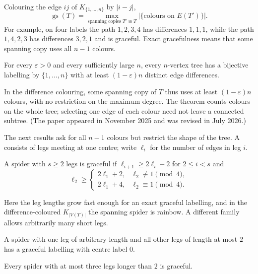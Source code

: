 Colouring the edge $ij$ of $K_{\{1,\dots,n\}}$ by $|i-j|$,
\[
\operatorname{gs}(T)=\max_{\text{spanning copies }T'\cong T}\bigl|\{\text{colours on }E(T')\}\bigr| .
\]
For example, on four labels the path $1,2,3,4$ has differences $1,1,1$, while the path $1,4,2,3$ has differences $3,2,1$ and is graceful. Exact gracefulness means that some spanning copy uses all $n-1$ colours.

\begin{theorem}\label{thm:lpw}
For every $\varepsilon>0$ and every sufficiently large $n$, every $n$-vertex tree has a bijective labelling by $\{1,\dots,n\}$ with at least $(1-\varepsilon)n$ distinct edge differences.
\end{theorem}

In the difference colouring, some spanning copy of $T$ thus uses at least $(1-\varepsilon)n$ colours, with no restriction on the maximum degree. The theorem counts colours on the whole tree; selecting one edge of each colour need not leave a connected subtree. (The paper appeared in November 2025 and was revised in July 2026.)


The next results ask for all $n-1$ colours but restrict the shape of the tree. A  consists of legs meeting at one centre; write $\ell_i$ for the number of edges in leg $i$.

\begin{theorem}\label{thm:sz3}
A spider with $s\geq2$ legs is graceful if $\ell_{i+1}\geq2\ell_i+2$ for $2\leq i<s$ and
\[
\ell_2\geq
\begin{cases}
2\ell_1+2, & \ell_2\not\equiv1\pmod4,\\
2\ell_1+4, & \ell_2\equiv1\pmod4.
\end{cases}
\]
\end{theorem}

Here the leg lengths grow fast enough for an exact graceful labelling, and in the difference-coloured $K_{|V(T)|}$ the spanning spider is rainbow. A different family allows arbitrarily many short legs.

\begin{theorem}\label{thm:sz4}
A spider with one leg of arbitrary length and all other legs of length at most $2$ has a graceful labelling with centre label $0$.
\end{theorem}

\begin{theorem}\label{thm:sz5}
Every spider with at most three legs longer than $2$ is graceful.
\end{theorem}

